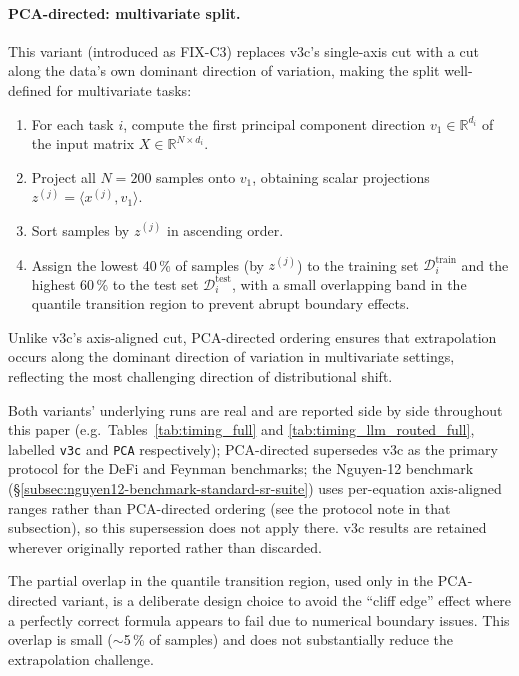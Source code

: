 \documentclass[twoside,11pt]{article}
\begin{document}
\paragraph{PCA-directed: multivariate split.}
This variant (introduced as FIX-C3) replaces v3c's single-axis cut with a
cut along the data's own dominant direction of variation, making the split
well-defined for multivariate tasks:
\begin{enumerate}[leftmargin=2em,label=\arabic*.]
  \item For each task $i$, compute the first principal component direction
    $v_1 \in \mathbb{R}^{d_i}$ of the input matrix $X \in \mathbb{R}^{N \times d_i}$.
  \item Project all $N=200$ samples onto $v_1$, obtaining scalar projections
    $z^{(j)} = \langle x^{(j)}, v_1 \rangle$.
  \item Sort samples by $z^{(j)}$ in ascending order.
  \item Assign the lowest 40\,\% of samples (by $z^{(j)}$) to the training set
    $\mathcal{D}^{\mathrm{train}}_i$ and the highest 60\,\% to the test set
    $\mathcal{D}^{\mathrm{test}}_i$, with a small overlapping band in the
    quantile transition region to prevent abrupt boundary effects.
\end{enumerate}
Unlike v3c's axis-aligned cut, PCA-directed ordering ensures that
extrapolation occurs along the dominant direction of variation in
multivariate settings, reflecting the most challenging direction of
distributional shift.

Both variants' underlying runs are real and are reported side by side
throughout this paper (e.g.\ Tables~\ref{tab:timing_full} and
\ref{tab:timing_llm_routed_full}, labelled \texttt{v3c} and \texttt{PCA}
respectively); PCA-directed supersedes v3c as the primary protocol for the
DeFi and Feynman benchmarks; the Nguyen-12 benchmark
(\S\ref{subsec:nguyen12-benchmark-standard-sr-suite}) uses per-equation
axis-aligned ranges rather than PCA-directed ordering (see the protocol
note in that subsection), so this supersession does not apply there.
v3c results are retained wherever originally reported rather than discarded.

\begin{remark}
The partial overlap in the quantile transition region, used only in the
PCA-directed variant, is a deliberate design choice to avoid the ``cliff
edge'' effect where a perfectly correct formula appears to fail due to
numerical boundary issues. This overlap is small ($\sim$5\,\% of samples)
and does not substantially reduce the extrapolation challenge.
\end{remark}
\end{document}
